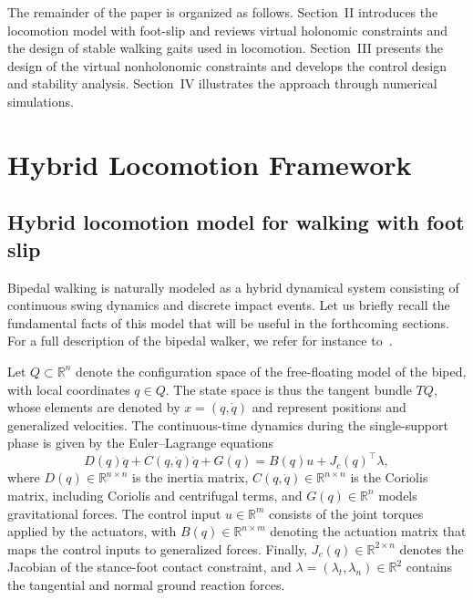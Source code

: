 \documentclass[letterpaper, 10 pt, conference]{ieeeconf}
\newcommand{\ara}[1]{\textcolor{purple}{(ARA: #1)}}
\begin{document}
The remainder of the paper is organized as follows.
Section~II introduces the locomotion model with foot-slip and reviews virtual holonomic constraints and the design of stable walking gaits used in locomotion. Section~III presents the design of the virtual nonholonomic constraints and develops the control design and stability analysis.
Section~IV illustrates the approach through numerical simulations.


\section{Hybrid Locomotion Framework}

\subsection{Hybrid locomotion model for walking with foot slip}\label{secIIA}

Bipedal walking is naturally modeled as a hybrid dynamical system consisting of continuous swing dynamics and discrete impact events. Let us briefly recall the fundamental facts of this model that will be useful in the forthcoming sections. For a full description of the bipedal walker, we refer for instance to~\cite{Westervelt2007}.



Let $Q\subset \mathbb{R}^n$ denote the configuration space of the free-floating model of the biped, with local coordinates $q \in Q$. The state space is thus the tangent bundle $TQ$, whose elements are denoted by $x=(q,\dot q)$ and represent positions and generalized velocities.
The continuous-time dynamics during the single-support phase is given by the Euler--Lagrange equations
\begin{equation}\label{ELeq}
D(q)\ddot q + C(q,\dot q)\dot q + G(q) = B(q) u + J_c(q)^\top \lambda ,
\end{equation}
where $D(q) \in \mathbb{R}^{n\times n}$ is the inertia matrix, $C(q,\dot q)\in\mathbb R^{n\times n}$ is the Coriolis matrix, including Coriolis and centrifugal terms, and $G(q)\in\mathbb R^n$ models gravitational forces.
The control input $u \in \mathbb{R}^m$ consists of the joint torques applied by the actuators, with 
$B(q) \in \mathbb{R}^{n\times m}$ denoting the actuation matrix that maps the control inputs to generalized forces.
Finally, $J_c(q)\in\mathbb R^{2\times n}$ denotes the Jacobian of the stance-foot contact constraint, and $\lambda=(\lambda_t,\lambda_n)\in\mathbb R^2$ contains the tangential and normal ground reaction forces.
\end{document}
